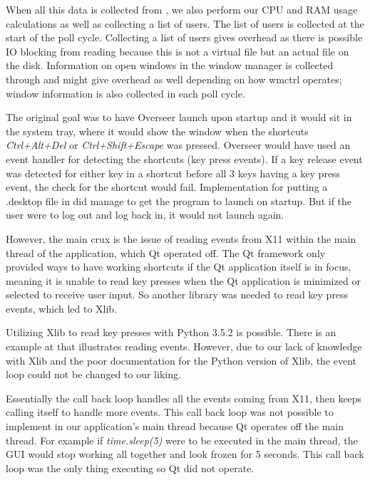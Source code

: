 \documentclass[12pt]{article}
\begin{document}
When all this data is collected from , we also perform our CPU and RAM usage calculations as well as collecting a list of users.
The list of users is collected at the start of the poll cycle.
Collecting a list of users gives overhead as there is possible IO blocking from reading  because this is not a virtual file but an actual file on the disk.
Information on open windows in the window manager is collected through  and might give overhead as well depending on how wmctrl operates; window information is also collected in each poll cycle. 

The original goal was to have Overseer launch upon startup and it would sit in the system tray, where it would show the window when the shortcuts \emph{Ctrl+Alt+Del} or \emph{Ctrl+Shift+Escape} was pressed.
Overseer would have used an event handler for detecting the shortcuts (key press events).
If a key release event was detected for either key in a shortcut before all 3 keys having a key press event, the check for the shortcut would fail.
Implementation for putting a .desktop file in  did manage to get the program to launch on startup. But if the user were to log out and log back in, it would not launch again.

However, the main crux is the issue of reading events from X11 within the main thread of the application, which Qt operated off.
The Qt framework only provided ways to have working shortcuts if the Qt application itself is in focus, meaning it is unable to read key presses when the Qt application is minimized or selected to receive user input.
So another library was needed to read key press events, which led to Xlib.

Utilizing Xlib to read key presses with Python 3.5.2 is possible.
There is an example at  that illustrates reading events.
However, due to our lack of knowledge with Xlib and the poor documentation \cite{badDocumentation} for the Python version of Xlib, the event loop could not be changed to our liking.

Essentially the call back loop handles all the events coming from X11, then keeps calling itself to handle more events.
This call back loop was not possible to implement in our application's main thread because Qt operates off the main thread.
For example if \emph{time.sleep(5)} were to be executed in the main thread, the GUI would stop working all together and look frozen for 5 seconds.
This call back loop was the only thing executing so Qt did not operate.
\end{document}
